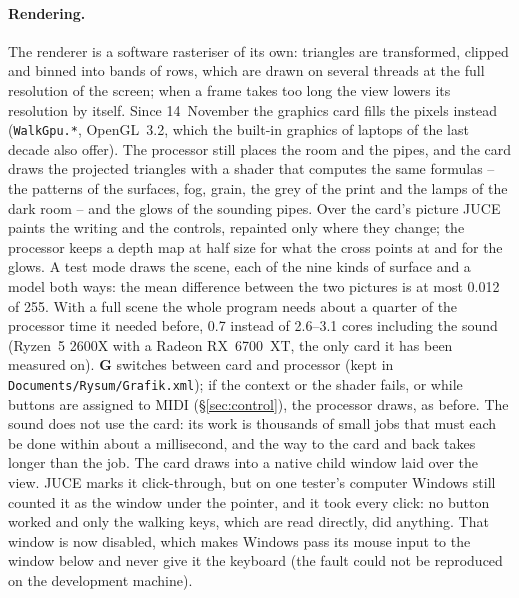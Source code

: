 \documentclass[11pt,a4paper,parskip=half,DIV=11,toc=bibliography]{scrartcl}
\newcommand{\fn}[1]{\mbox{\texttt{#1}}}
\begin{document}
\paragraph{Rendering.} The renderer is a software rasteriser of its own: triangles are transformed, clipped and binned into bands of rows, which
are drawn on several threads at the full resolution of the screen; when a frame takes too long the view lowers its resolution by itself. Since
14~November the graphics card fills the pixels instead (\fn{WalkGpu.*}, OpenGL~3.2, which the built-in graphics of laptops of the last decade
also offer). The processor still places the room and the pipes, and the card draws the projected triangles with a shader that computes the
same formulas -- the patterns of the surfaces, fog, grain, the grey of the print and the lamps of the dark room -- and the glows of the sounding
pipes. Over the card's picture JUCE paints the writing and the controls, repainted only where they change; the processor keeps a depth map at
half size for what the cross points at and for the glows. A test mode draws the scene, each of the nine kinds of surface and a model both
ways: the mean difference between the two pictures is at most 0.012 of 255. With a full scene the whole program needs about a quarter of the
processor time it needed before, 0.7 instead of 2.6--3.1 cores including the sound (Ryzen~5 2600X with a Radeon RX~6700~XT, the only card it has
been measured on). \textbf{G} switches between card and processor (kept in \fn{Documents/Rysum/Grafik.xml}); if the context or the shader fails,
or while buttons are assigned to MIDI (\S\ref{sec:control}), the processor draws, as before. The sound does not use the card: its work is
thousands of small jobs that must each be done within about a millisecond, and the way to the card and back takes longer than the job.
The card draws into a native child window laid over the view. JUCE marks it click-through, but on one tester's computer Windows still counted it
as the window under the pointer, and it took every click: no button worked and only the walking keys, which are read directly, did anything. That
window is now disabled, which makes Windows pass its mouse input to the window below and never give it the keyboard (the fault could not be
reproduced on the development machine).
\end{document}
